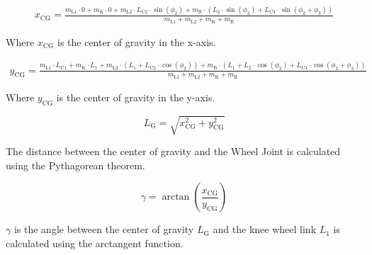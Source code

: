 \begin{equation}
    \begin{aligned}
        x_{\mathrm{CG}} = \frac{m_{\mathrm{L1}} \cdot 0 + m_{\mathrm{K}} \cdot 0 + m_{\mathrm{L2}} \cdot L_{\mathrm{C2}} \cdot \sin(\phi_{\mathrm{2}}) + m_{\mathrm{B}} \cdot (L_{\mathrm{2}} \cdot \sin(\phi_{\mathrm{2}}) + L_{\mathrm{C3}} \cdot \sin(\phi_{\mathrm{2}} + \phi_{\mathrm{3}}))}{m_{\mathrm{L1}} + m_{\mathrm{L2}} + m_{\mathrm{K}} + m_{\mathrm{B}}}
    \end{aligned}
\end{equation}

Where $x_{\mathrm{CG}}$ is the center of gravity in the x-axis.

	\begin{equation}
    \begin{aligned}
        y_{\mathrm{CG}} = \frac{m_{\mathrm{L1}} \cdot L_{\mathrm{C1}} + m_{\mathrm{K}} \cdot L_{\mathrm{1}} + m_{\mathrm{L2}} \cdot (L_{\mathrm{1}} + L_{\mathrm{C2}} \cdot \cos(\phi_{\mathrm{2}})) + m_{\mathrm{B}} \cdot (L_{\mathrm{1}} + L_{\mathrm{2}} \cdot \cos(\phi_{\mathrm{2}}) + L_{\mathrm{C3}} \cdot \cos(\phi_{\mathrm{2}} + \phi_{\mathrm{3}}))}{m_{\mathrm{L1}} + m_{\mathrm{L2}} + m_{\mathrm{K}} + m_{\mathrm{B}}}
    \end{aligned}
\end{equation}

Where $y_{\mathrm{CG}}$ is the center of gravity in the y-axis.

	\begin{equation}
    L_{\mathrm{G}} = \sqrt{x_{\mathrm{CG}}^2 + y_{\mathrm{CG}}^2}
\end{equation}

The distance between the center of gravity and the Wheel Joint is calculated using the Pythagorean theorem.

	\begin{equation}
    \gamma= \arctan\left(\frac{x_{\mathrm{CG}}}{y_{\mathrm{CG}}}\right)
	\end{equation}

$\gamma$ is the angle between the center of gravity $L_{\mathrm{G}}$ and the knee wheel link $L_1$ is calculated using the arctangent function.

